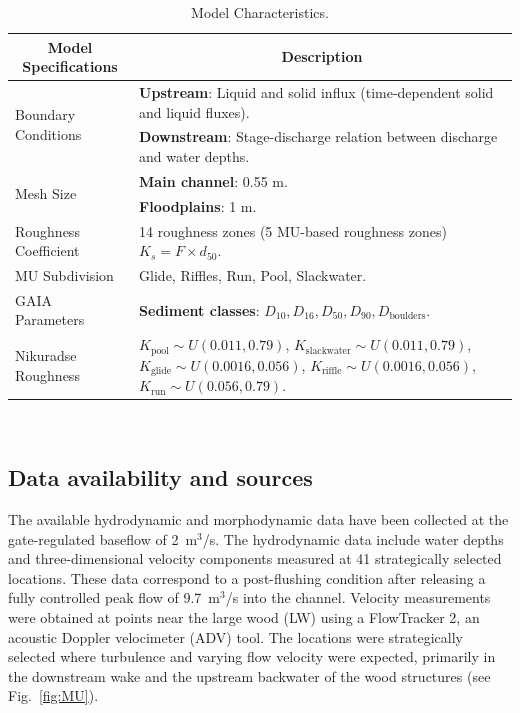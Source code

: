 \documentclass[draft,linenumbers,onecolumn]{agujournal2019} %
\begin{document}
\begin{table}[H] 
	\centering
	\caption{Model Characteristics.}
	\begin{tabular}{p{4cm} p{10cm}}
		\hline
		\multicolumn{1}{c}{\textbf{Model Specifications}} & \multicolumn{1}{c}{\textbf{Description}} \\ \hline
		\multirow{2}{4cm}{Boundary Conditions} & \textbf{Upstream}: Liquid and solid influx (time-dependent solid and liquid fluxes). \\ 
		& \textbf{Downstream}: Stage-discharge relation between discharge and water depths. \\ \hline
		\multirow{2}{4cm}{Mesh Size} & \textbf{Main channel}: 0.55 m. \\ 
		& \textbf{Floodplains}: 1 m. \\ \hline
		Roughness Coefficient & 14 roughness zones (5 MU-based roughness zones) \( K_{s} = F \times d_{50} \). \\ \hline
		MU Subdivision & Glide, Riffles, Run, Pool, Slackwater. \\ \hline
		\multirow{1}{4cm}{GAIA Parameters} & \textbf{Sediment classes}: \( D_{10}, D_{16}, D_{50}, D_{90}, D_{\text{boulders}} \). \\ \hline
		Nikuradse Roughness & 
		\( K_{\text{pool}} \sim U(0.011, 0.79) \), 
		\( K_{\text{slackwater}} \sim U(0.011, 0.79) \), 
		\( K_{\text{glide}} \sim U(0.0016, 0.056) \), 
		\( K_{\text{riffle}} \sim U(0.0016, 0.056) \), 
		\( K_{\text{run}} \sim U(0.056, 0.79) \). \\ \hline
	\end{tabular}
	\label{tab:model_characteristics}
\end{table}
 \vspace{-20pt}      
\FloatBarrier
\subsection{Data availability and sources}
\label{sec:Sec2.3}
The available hydrodynamic and morphodynamic data have been collected at the gate-regulated baseflow of 2~m$^3$/s. 
The hydrodynamic data include water depths and three-dimensional velocity components measured at 41 strategically selected locations. 
These data correspond to a post-flushing condition after releasing a fully controlled peak flow of 9.7~m$^3$/s into the channel. 
Velocity measurements were obtained at points near the large wood (LW) using a FlowTracker 2, an acoustic Doppler velocimeter (ADV) tool. 
The locations were strategically selected where turbulence and varying flow velocity were expected, primarily in the downstream wake and the upstream backwater of the wood structures \cite{schalko2024flow}(see Fig.~\ref{fig:MU}). 
\end{document}
